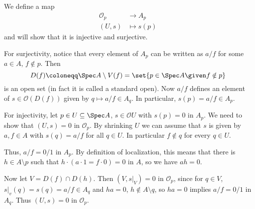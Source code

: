 We define a map
\begin{align*}
	\mathcal{O}_p&\to A_p\\
	(U, s)&\mapsto s(p)
\end{align*}
and will show that it is injective and surjective.

For surjectivity, notice that every element of $A_p$ can be written as
$a/f$ for some $a \in A$, $f \notin p$. Then
\[ D(f)\coloneqq \Spec A\setminus V(f) = \set{p \in \Spec A\given f\notin p} \]
is an open set (in fact it is called a standard open). Now $a/f$ defines an
element of $s \in \mathcal{O}(D(f))$ given by $q\mapsto a/f \in A_q$.
In particular, $s(p) = a/f \in A_p$.

For injectivity, let $p \in U \subseteq \Spec A$, $s \in \mathcal{O}U$ with $s(p) = 0$ in
$A_p$. We need to show that $(U, s) = 0$ in $\mathcal{O}_p$. By shrinking $U$
we can assume that $s$ is given by $a, f \in A$ with $s(q) = a/f$ for all $q \in U$.
In particular $f\notin q$ for every $q \in U$.

Thus, $a/f = 0/1$ in $A_p$. By definition of localization, this means that there
is $h \in A\setminus p$ such that  $h\cdot(a\cdot 1 = f\cdot 0) = 0$ in $A$,
so we have $ah = 0$.

Now let $V = D(f)\cap D(h)$. Then $(V, s|_V) = 0$ in $\mathcal{O}_p$, since
for $q \in V$, $s|_v(q) = s(q) = a/f \in A_q$ and $ha = 0$, $h \notin A\setminus q$,
so $ha = 0$ implies $a/f = 0/1$ in $A_q$. Thus $(U, s) = 0$ in $\mathcal{O}_p$.

